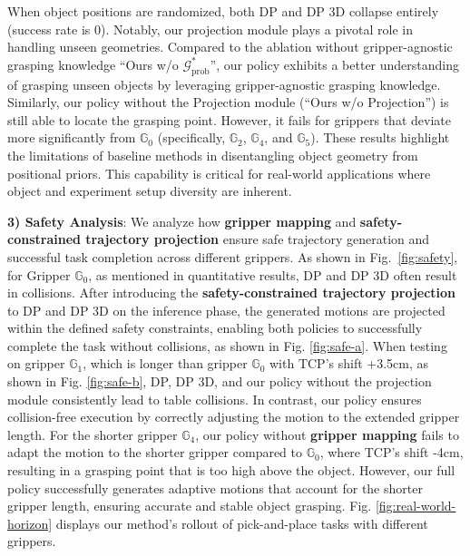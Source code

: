 When object positions are randomized, both DP and DP 3D collapse entirely (success rate is 0). Notably, our projection module plays a pivotal role in handling unseen geometries. Compared to the ablation without gripper-agnostic grasping knowledge ``Ours w/o \( \mathcal{G}^*_{\text{prob}} \)'', our policy exhibits a better understanding of grasping unseen objects by leveraging gripper-agnostic grasping knowledge. Similarly, our policy without the Projection module (``Ours w/o Projection'') is still able to locate the grasping point. However, it fails for grippers that deviate more significantly from \( \mathbb{G}_0 \) (specifically, \( \mathbb{G}_2 \), \( \mathbb{G}_4 \), and \( \mathbb{G}_5 \)). These results highlight the limitations of baseline methods in disentangling object geometry from positional priors. This capability is critical for real-world applications where object and experiment setup diversity are inherent.


\textbf{3) Safety Analysis}:
We analyze how \textbf{gripper mapping} and \textbf{safety-constrained trajectory projection} ensure safe trajectory generation and successful task completion across different grippers. As shown in Fig.~\ref{fig:safety}, for Gripper \( \mathbb{G}_0 \), as mentioned in quantitative results, DP and DP 3D often result in collisions. After introducing the \textbf{safety-constrained trajectory projection} to DP and DP 3D on the inference phase, the generated motions are projected within the defined safety constraints, enabling both policies to successfully complete the task without collisions, as shown in Fig. \ref{fig:safe-a}. When testing on gripper \( \mathbb{G}_1 \), which is longer than gripper \( \mathbb{G}_0 \) with TCP's shift +3.5cm, as shown in Fig. \ref{fig:safe-b}, DP, DP 3D, and our policy without the projection module consistently lead to table collisions. In contrast, our policy ensures collision-free execution by correctly adjusting the motion to the extended gripper length. For the shorter gripper \( \mathbb{G}_4 \), our policy without \textbf{gripper mapping} fails to adapt the motion to the shorter gripper compared to \( \mathbb{G}_0 \), where TCP's shift -4cm, resulting in a grasping point that is too high above the object. However, our full policy successfully generates adaptive motions that account for the shorter gripper length, ensuring accurate and stable object grasping. Fig. \ref{fig:real-world-horizon} displays our method's rollout of pick-and-place tasks with different grippers.



